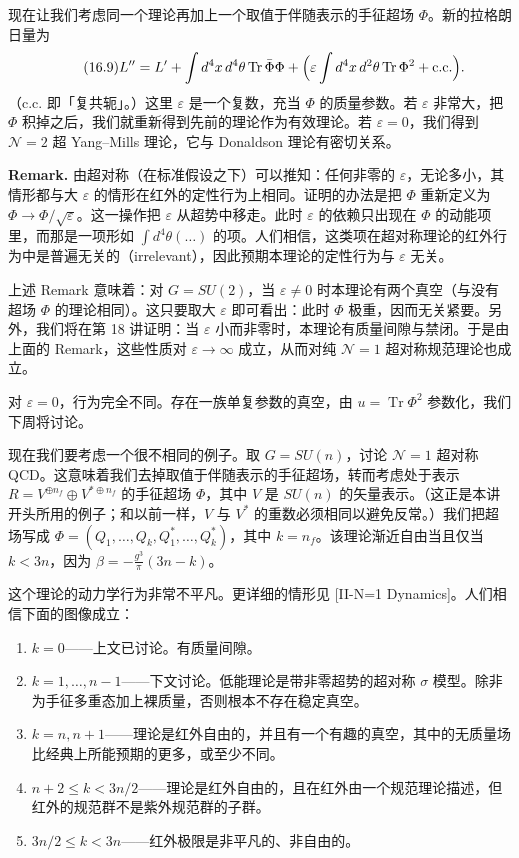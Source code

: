 现在让我们考虑同一个理论再加上一个取值于伴随表示的手征超场 $\Phi$。新的拉格朗日量为
\begin{equation}
  \tag{16.9}
  \label{eq:16-9}
  L''=L'+\int d^4x\,d^4\theta\operatorname{Tr}\bar\Phi\Phi+\Bigl(\varepsilon\int d^4x\,d^2\theta\operatorname{Tr}\Phi^2+\text{c.c.}\Bigr).
\end{equation}
（c.c. 即「复共轭」。）这里 $\varepsilon$ 是一个复数，充当 $\Phi$ 的质量参数。若 $\varepsilon$ 非常大，把 $\Phi$ 积掉之后，我们就重新得到先前的理论作为有效理论。若 $\varepsilon=0$，我们得到 $\mathcal{N}=2$ 超 Yang--Mills 理论，它与 Donaldson 理论有密切关系。

\textbf{Remark.} 由超对称（在标准假设之下）可以推知：任何非零的 $\varepsilon$，无论多小，其情形都与大 $\varepsilon$ 的情形在红外的定性行为上相同。证明的办法是把 $\Phi$ 重新定义为 $\Phi\to\Phi/\sqrt{\varepsilon}$。这一操作把 $\varepsilon$ 从超势中移走。此时 $\varepsilon$ 的依赖只出现在 $\Phi$ 的动能项里，而那是一项形如 $\int d^4\theta(\dots)$ 的项。人们相信，这类项在超对称理论的红外行为中是普遍无关的（irrelevant），因此预期本理论的定性行为与 $\varepsilon$ 无关。

上述 Remark 意味着：对 $G=SU(2)$，当 $\varepsilon\ne0$ 时本理论有两个真空（与没有超场 $\Phi$ 的理论相同）。这只要取大 $\varepsilon$ 即可看出：此时 $\Phi$ 极重，因而无关紧要。另外，我们将在第 18 讲证明：当 $\varepsilon$ 小而非零时，本理论有质量间隙与禁闭。于是由上面的 Remark，这些性质对 $\varepsilon\to\infty$ 成立，从而对纯 $\mathcal{N}=1$ 超对称规范理论也成立。

对 $\varepsilon=0$，行为完全不同。存在一族单复参数的真空，由 $u=\operatorname{Tr}\Phi^2$ 参数化，我们下周将讨论。

现在我们要考虑一个很不相同的例子。取 $G=SU(n)$，讨论 $\mathcal{N}=1$ 超对称 QCD。这意味着我们去掉取值于伴随表示的手征超场，转而考虑处于表示 $R=V^{\oplus n_f}\oplus V^{*\oplus n_f}$ 的手征超场 $\Phi$，其中 $V$ 是 $SU(n)$ 的矢量表示。（这正是本讲开头所用的例子；和以前一样，$V$ 与 $V^*$ 的重数必须相同以避免反常。）我们把超场写成 $\Phi=(Q_1,\dots,Q_k,Q_1^*,\dots,Q_k^*)$，其中 $k=n_f$。该理论渐近自由当且仅当 $k<3n$，因为 $\beta=-\frac{g^3}{\pi}(3n-k)$。

这个理论的动力学行为非常不平凡。更详细的情形见 [II-N=1 Dynamics]。人们相信下面的图像成立：
\begin{enumerate}
  \item $k=0$——上文已讨论。有质量间隙。
  \item $k=1,\dots,n-1$——下文讨论。低能理论是带非零超势的超对称 $\sigma$ 模型。除非为手征多重态加上裸质量，否则根本不存在稳定真空。


  \item $k=n,n+1$——理论是红外自由的，并且有一个有趣的真空，其中的无质量场比经典上所能预期的更多，或至少不同。
  \item $n+2\le k<3n/2$——理论是红外自由的，且在红外由一个规范理论描述，但红外的规范群不是紫外规范群的子群。
  \item $3n/2\le k<3n$——红外极限是非平凡的、非自由的。
\end{enumerate}

